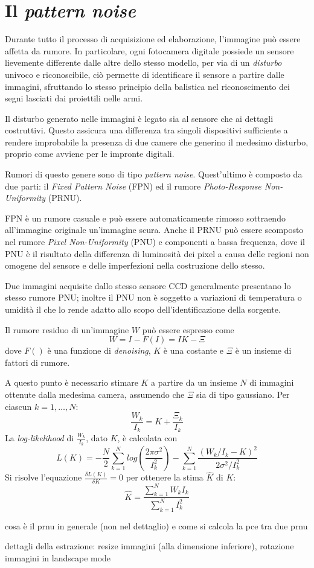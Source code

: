 \section{Il \emph{pattern noise}}

Durante tutto il processo di acquisizione ed elaborazione, l'immagine può essere affetta da rumore. 
In particolare, ogni fotocamera digitale possiede un sensore
lievemente differente dalle altre dello stesso modello, per via di un \emph{disturbo}
univoco e riconoscibile, ciò permette di identificare il sensore a partire dalle
immagini, sfruttando lo stesso principio della balistica nel riconoscimento dei segni lasciati dai proiettili nelle armi.

Il disturbo generato nelle immagini è legato sia al sensore che ai dettagli costruttivi. Questo
assicura una differenza tra singoli dispositivi sufficiente a rendere improbabile
la presenza di due camere che generino il medesimo disturbo, proprio come avviene per le impronte digitali. 

Rumori di questo genere sono di tipo \emph{pattern noise}. Quest'ultimo è composto da due parti: il \emph{Fixed Pattern Noise} (FPN) ed il rumore \emph{Photo-Response Non-Uniformity} (PRNU).

FPN è un rumore casuale e può essere automaticamente rimosso sottraendo all'immagine originale un'immagine scura. Anche il PRNU può essere scomposto nel rumore \emph{Pixel Non-Uniformity} (PNU) e componenti a bassa frequenza, dove il PNU è il risultato della differenza di luminosità dei pixel a causa delle regioni non omogene del sensore e delle imperfezioni nella costruzione dello stesso.

Due immagini acquisite dallo stesso sensore CCD generalmente presentano lo stesso rumore PNU; inoltre il PNU non è soggetto a variazioni di temperatura o umidità il che lo rende adatto allo scopo dell'identificazione della sorgente.

Il rumore residuo di un'immagine $W$ può essere espresso come
$$
W = I - F(I) = IK - \Xi
$$
dove $F()$ è una funzione di \emph{denoising}, $K$ è una costante e $\Xi$ è un insieme di fattori di rumore.

A questo punto è necessario stimare $K$ a partire da un insieme $N$ di immagini ottenute dalla medesima camera, assumendo che $\Xi$ sia di tipo gaussiano. Per ciascun $k = 1, \ldots, N$:
$$
\frac{W_k}{I_k} = K + \frac{\Xi_k}{I_k}
$$
La \emph{log-likelihood} di $\frac{W_k}{I_k}$, dato $K$, è calcolata con
$$
L(K) = -\frac{N}{2} \sum_{k = 1}^{N} log(\frac{2\pi\sigma^2}{I_{k}^{2}}) -  \sum_{k = 1}^{N} \frac{(W_k / I_k - K)^2}{2\sigma^2 / I_{k}^{2}}
$$
Si risolve l'equazione $\frac{\delta L(K)}{\delta K} = 0$ per ottenere la stima $\hat{K}$ di $K$:
$$
\hat{K} = \frac{\sum_{k = 1}^{N} W_k I_k}{\sum_{k = 1}^{N} I_{k}^{2}}
$$



cosa è il prnu in generale (non nel dettaglio) e come si calcola la pce tra due prnu

dettagli della estrazione: resize immagini (alla dimensione inferiore), rotazione immagini in landscape mode